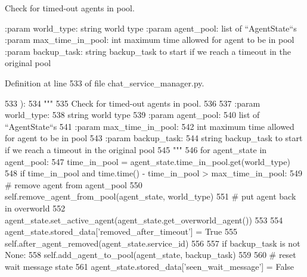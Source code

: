 \begin{DoxyVerb}Check for timed-out agents in pool.

:param world_type:
    string world type
:param agent_pool:
    list of ``AgentState``s
:param max_time_in_pool:
    int maximum time allowed for agent to be in pool
:param backup_task:
    string backup_task to start if we reach a timeout in the original pool
\end{DoxyVerb}
 

Definition at line 533 of file chat\+\_\+service\+\_\+manager.\+py.


\begin{DoxyCode}
533     ):
534         \textcolor{stringliteral}{"""}
535 \textcolor{stringliteral}{        Check for timed-out agents in pool.}
536 \textcolor{stringliteral}{}
537 \textcolor{stringliteral}{        :param world\_type:}
538 \textcolor{stringliteral}{            string world type}
539 \textcolor{stringliteral}{        :param agent\_pool:}
540 \textcolor{stringliteral}{            list of ``AgentState``s}
541 \textcolor{stringliteral}{        :param max\_time\_in\_pool:}
542 \textcolor{stringliteral}{            int maximum time allowed for agent to be in pool}
543 \textcolor{stringliteral}{        :param backup\_task:}
544 \textcolor{stringliteral}{            string backup\_task to start if we reach a timeout in the original pool}
545 \textcolor{stringliteral}{        """}
546         \textcolor{keywordflow}{for} agent\_state \textcolor{keywordflow}{in} agent\_pool:
547             time\_in\_pool = agent\_state.time\_in\_pool.get(world\_type)
548             \textcolor{keywordflow}{if} time\_in\_pool \textcolor{keywordflow}{and} time.time() - time\_in\_pool > max\_time\_in\_pool:
549                 \textcolor{comment}{# remove agent from agent\_pool}
550                 self.remove\_agent\_from\_pool(agent\_state, world\_type)
551                 \textcolor{comment}{# put agent back in overworld}
552                 agent\_state.set\_active\_agent(agent\_state.get\_overworld\_agent())
553 
554                 agent\_state.stored\_data[\textcolor{stringliteral}{'removed\_after\_timeout'}] = \textcolor{keyword}{True}
555                 self.after\_agent\_removed(agent\_state.service\_id)
556 
557                 \textcolor{keywordflow}{if} backup\_task \textcolor{keywordflow}{is} \textcolor{keywordflow}{not} \textcolor{keywordtype}{None}:
558                     self.add\_agent\_to\_pool(agent\_state, backup\_task)
559 
560                 \textcolor{comment}{# reset wait message state}
561                 agent\_state.stored\_data[\textcolor{stringliteral}{'seen\_wait\_message'}] = \textcolor{keyword}{False}

\end{DoxyCode}
